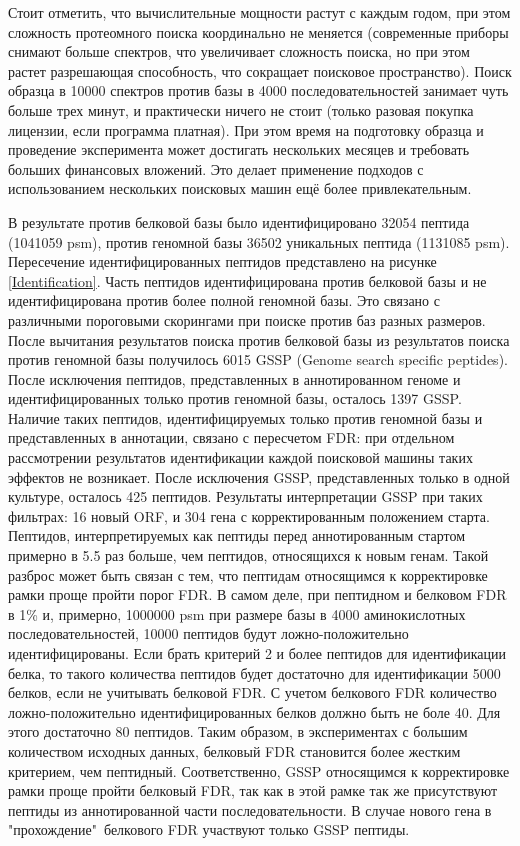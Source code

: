 Стоит отметить, что вычислительные мощности растут с каждым годом, при этом сложность протеомного поиска координально не меняется (современные приборы снимают больше спектров, что увеличивает сложность поиска, но при этом растет разрешающая способность, что сокращает поисковое пространство). Поиск образца в 10000 спектров против базы в 4000 последовательностей занимает чуть больше трех минут, и практически ничего не стоит (только разовая покупка лицензии, если программа платная). При этом время на подготовку образца и проведение эксперимента может достигать нескольких месяцев и требовать больших финансовых вложений. Это делает применение подходов с использованием нескольких поисковых машин ещё более привлекательным.  


В результате против белковой базы было идентифицировано 32054 пептида (1041059 psm), против геномной базы 36502 уникальных пептида (1131085 psm). Пересечение идентифицированных пептидов представлено на рисунке \ref{Identification}. Часть пептидов идентифицирована против белковой базы и не идентифицирована против более полной геномной базы. Это связано с различными пороговыми скорингами при поиске против баз разных размеров. 
После вычитания результатов поиска против белковой базы из результатов поиска против геномной базы получилось 6015 GSSP (Genome search specific peptides).  После исключения пептидов, представленных в аннотированном геноме и идентифицированных только против геномной базы, осталось 1397 GSSP. Наличие таких пептидов, идентифицируемых только против геномной базы и представленных в аннотации, связано с пересчетом FDR: при отдельном рассмотрении результатов идентификации каждой поисковой машины таких эффектов не возникает. После исключения GSSP, представленных только в одной культуре, осталось 425 пептидов. Результаты интерпретации GSSP при таких фильтрах: 16 новый ORF, и 304 гена с корректированным положением старта.  
Пептидов, интерпретируемых как пептиды перед аннотированным стартом примерно в 5.5 раз больше, чем пептидов, относящихся к новым генам. Такой разброс может быть связан с тем, что пептидам относящимся к корректировке рамки проще пройти порог FDR. В самом деле, при пептидном и белковом FDR в 1\% и, примерно, 1000000 psm при размере базы в 4000 аминокислотных последовательностей, 10000 пептидов будут ложно-положительно идентифицированы. Если брать критерий 2 и более пептидов для идентификации белка, то такого количества пептидов будет достаточно для идентификации 5000 белков, если не учитывать белковой FDR. С учетом белкового FDR количество ложно-положительно идентифицированных белков должно быть не боле 40. Для этого достаточно 80 пептидов. Таким образом, в экспериментах с большим количеством исходных данных, белковый FDR становится более жестким критерием, чем пептидный. Соответственно, GSSP относящимся к корректировке рамки проще пройти белковый FDR, так как в этой рамке так же присутствуют пептиды из аннотированной части последовательности. В случае нового гена в "прохождение"\ белкового FDR участвуют только GSSP пептиды.

